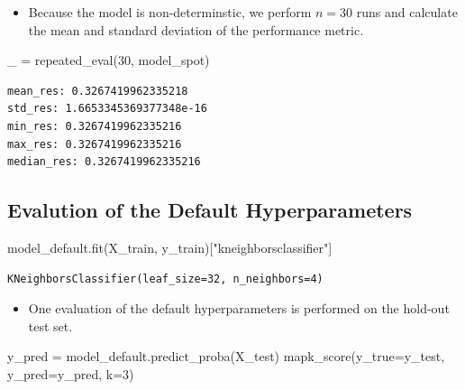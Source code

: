 \documentclass[
  letterpaper,
  DIV=11,
  numbers=noendperiod]{scrreprt}
\newenvironment{Shaded}{\begin{snugshade}}{\end{snugshade}}
\newcommand{\DecValTok}[1]{\textcolor[rgb]{0.68,0.00,0.00}{#1}}
\newcommand{\NormalTok}[1]{\textcolor[rgb]{0.00,0.23,0.31}{#1}}
\newcommand{\OperatorTok}[1]{\textcolor[rgb]{0.37,0.37,0.37}{#1}}
\newcommand{\StringTok}[1]{\textcolor[rgb]{0.13,0.47,0.30}{#1}}
\providecommand{\tightlist}{%
  \setlength{\itemsep}{0pt}\setlength{\parskip}{0pt}}\usepackage{longtable,booktabs,array}
\begin{document}
\begin{itemize}
\tightlist
\item
  Because the model is non-determinstic, we perform \(n=30\) runs and
  calculate the mean and standard deviation of the performance metric.
\end{itemize}

\begin{Shaded}
\begin{Highlighting}[]
\NormalTok{\_ }\OperatorTok{=}\NormalTok{ repeated\_eval(}\DecValTok{30}\NormalTok{, model\_spot)}
\end{Highlighting}
\end{Shaded}

\begin{verbatim}
mean_res: 0.3267419962335218
std_res: 1.6653345369377348e-16
min_res: 0.3267419962335216
max_res: 0.3267419962335216
median_res: 0.3267419962335216
\end{verbatim}

\hypertarget{evalution-of-the-default-hyperparameters-3}{%
\subsection{Evalution of the Default
Hyperparameters}\label{evalution-of-the-default-hyperparameters-3}}

\begin{Shaded}
\begin{Highlighting}[]
\NormalTok{model\_default.fit(X\_train, y\_train)[}\StringTok{"kneighborsclassifier"}\NormalTok{]}
\end{Highlighting}
\end{Shaded}

\begin{verbatim}
KNeighborsClassifier(leaf_size=32, n_neighbors=4)
\end{verbatim}

\begin{itemize}
\tightlist
\item
  One evaluation of the default hyperparameters is performed on the
  hold-out test set.
\end{itemize}

\begin{Shaded}
\begin{Highlighting}[]
\NormalTok{y\_pred }\OperatorTok{=}\NormalTok{ model\_default.predict\_proba(X\_test)}
\NormalTok{mapk\_score(y\_true}\OperatorTok{=}\NormalTok{y\_test, y\_pred}\OperatorTok{=}\NormalTok{y\_pred, k}\OperatorTok{=}\DecValTok{3}\NormalTok{)}
\end{Highlighting}
\end{Shaded}
\end{document}
